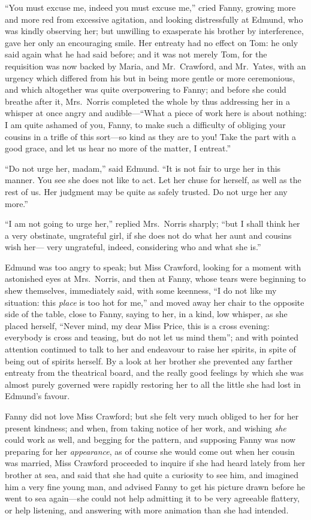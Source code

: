 ``You must excuse me, indeed you must excuse me,'' cried Fanny,
growing more and more red from excessive agitation,
and looking distressfully at Edmund, who was kindly
observing her; but unwilling to exasperate his brother
by interference, gave her only an encouraging smile.
Her entreaty had no effect on Tom:  he only said again
what he had said before; and it was not merely Tom,
for the requisition was now backed by Maria, and Mr.\ Crawford,
and Mr.\ Yates, with an urgency which differed from
his but in being more gentle or more ceremonious,
and which altogether was quite overpowering to Fanny;
and before she could breathe after it, Mrs.\ Norris completed
the whole by thus addressing her in a whisper at once angry
and audible---``What a piece of work here is about nothing:
I am quite ashamed of you, Fanny, to make such a difficulty
of obliging your cousins in a trifle of this sort---so kind
as they are to you!  Take the part with a good grace,
and let us hear no more of the matter, I entreat.''

``Do not urge her, madam,'' said Edmund.  ``It is not fair to
urge her in this manner.  You see she does not like to act.
Let her chuse for herself, as well as the rest of us.
Her judgment may be quite as safely trusted.  Do not urge
her any more.''

``I am not going to urge her,'' replied Mrs.\ Norris sharply;
``but I shall think her a very obstinate, ungrateful girl,
if she does not do what her aunt and cousins wish her---%
very ungrateful, indeed, considering who and what she is.''

Edmund was too angry to speak; but Miss Crawford,
looking for a moment with astonished eyes at Mrs.\ Norris,
and then at Fanny, whose tears were beginning to shew
themselves, immediately said, with some keenness, ``I do
not like my situation:  this \emph{place} is too hot for me,''
and moved away her chair to the opposite side of the table,
close to Fanny, saying to her, in a kind, low whisper,
as she placed herself, ``Never mind, my dear Miss Price,
this is a cross evening:  everybody is cross and teasing,
but do not let us mind them''; and with pointed attention
continued to talk to her and endeavour to raise her spirits,
in spite of being out of spirits herself.  By a look at
her brother she prevented any farther entreaty from the
theatrical board, and the really good feelings by which she
was almost purely governed were rapidly restoring her
to all the little she had lost in Edmund's favour.

Fanny did not love Miss Crawford; but she felt very much
obliged to her for her present kindness; and when,
from taking notice of her work, and wishing \emph{she} could
work as well, and begging for the pattern, and supposing
Fanny was now preparing for her \emph{appearance}, as of
course she would come out when her cousin was married,
Miss Crawford proceeded to inquire if she had heard lately
from her brother at sea, and said that she had quite
a curiosity to see him, and imagined him a very fine
young man, and advised Fanny to get his picture drawn
before he went to sea again---she could not help admitting
it to be very agreeable flattery, or help listening,
and answering with more animation than she had intended.

